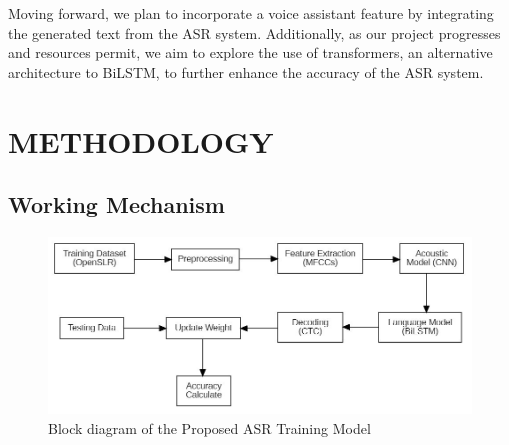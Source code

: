 Moving forward, we plan to incorporate a voice assistant feature by integrating the generated text from the ASR system. Additionally, as our project progresses and resources permit, we aim to explore the use of transformers, an alternative architecture to BiLSTM, to further enhance the accuracy of the ASR system.




\chapter{METHODOLOGY}

\section{Working Mechanism}

\begin{figure}[h]
\centering
    \includegraphics[scale=0.5]{images/Training Flowchart.jpg}
    \caption{Block diagram of the Proposed ASR Training Model}
    \label{fig:my_label}
\end{figure}

